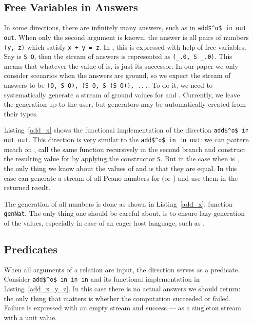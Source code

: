 \subsection{Free Variables in Answers}



In some directions, there are infinitely many answers, such as in \lstinline{add$^o$ in out out}.
When only the second argument is known, the answer is all pairs of numbers \lstinline{(y, z)} which satisfy \lstinline{x + y = z}.
In \mk, this is expressed with help of free variables.
Say \x is \lstinline{S O}, then the stream of answers is represented as \lstinline{(_.0, S _.0)}.
This means that whatever the value of \y is, \z is just its successor.
In our paper we only consider scenarios when the answers are ground, so we expect the stream of answers to be \lstinline{(O, S O), (S O, S (S O)), ...}.
To do it, we need to systematically generate a stream of ground values for \y and \z.
Currently, we leave the generation up to the user, but generators may be automatically created from their types.

Listing~\ref{add_x} shows the functional implementation of the direction \lstinline{add$^o$ in out out}.
This direction is very similar to the \lstinline{add$^o$ in in out}: we can pattern match on \x, call the same function recursively in the second \conde branch and construct the resulting value for \z by applying the constructor \lstinline{S}.
But in the case when \x is \zero, the only thing we know about the values of \y and \z is that they are equal.
In this case can generate a stream of all Peano numbers for \z (or \y) and use them in the returned result.

The generation of all numbers is done as shown in Listing~\ref{add_x}, function \lstinline{genNat}.
The only thing one should be careful about, is to ensure lazy generation of the values, especially in case of an eager host language, such as \ocaml.



\subsection{Predicates}

When all arguments of a relation are input, the direction serves as a predicate.
Consider \lstinline{add$^o$ in in in} and its functional implementation in Listing~\ref{add_x_y_z}.
In this case there is no actual answers we should return: the only thing that matters is whether the computation succeeded or failed.
Failure is expressed with an empty stream and success --- as a singleton stream with a unit value.

